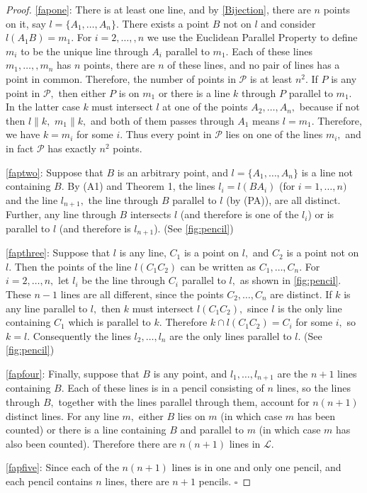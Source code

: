 \documentclass[
  twoside,
  12pt,
  letterpaper,
  fleqn]{article}
\theoremstyle{definition}
\theoremstyle{definition}
\theoremstyle{plain}
\theoremstyle{plain}
\theoremstyle{remark}
\begin{document}
\begin{proof}

\eqref{fapone}: There is at least one line, and by \eqref{Bijection},
there are \(n\) points on it, say \(l=\{A_1, \dots, A_n\}.\) There
exists a point \(B\) not on \(l\) and consider \(l(A_1B)=m_1.\) For
\(i=2, \ldots, ,n\) we use the Euclidean Parallel Property to define
\(m_i\) to be the unique line through \(A_i\) parallel to \(m_1.\) Each
of these lines \(m_1,\ldots, , m_n\) has \(n\) points, there are \(n\)
of these lines, and no pair of lines has a point in common. Therefore,
the number of points in \(\mathcal{P}\) is at least \(n^2.\) If \(P\) is
any point in \(\mathcal{P},\) then either \(P\) is on \(m_1\) or there
is a line \(k\) through \(P\) parallel to \(m_1.\) In the latter case
\(k\) must intersect \(l\) at one of the points \(A_2, \ldots, A_n,\)
because if not then \(l \parallel k,\) \(m_1 \parallel k,\) and both of
them passes through \(A_1\) means \(l=m_1.\) Therefore, we have
\(k=m_i\) for some \(i.\) Thus every point in \(\mathcal{P}\) lies on
one of the lines \(m_i,\) and in fact \(\mathcal{P}\) has exactly
\(n^2\) points.

\eqref{faptwo}: Suppose that \(B\) is an arbitrary point, and
\(l=\{A_1,\ldots, A_n\}\) is a line not containing \(B.\) By (A1) and
Theorem 1, the lines \(l_i=l(BA_i)\) (for \(i=1,\ldots,n)\) and the line
\(l_{n+1},\) the line through \(B\) parallel to \(l\) (by (PA)), are all
distinct. Further, any line through \(B\) intersects \(l\) (and
therefore is one of the \(l_i\)) or is parallel to \(l\) (and therefore
is \(l_{n+1}\)). (See \eqref{fig:pencil})

\eqref{fapthree}: Suppose that \(l\) is any line, \(C_1\) is a point on
\(l,\) and \(C_2\) is a point not on \(l.\) Then the points of the line
\(l(C_1C_2)\) can be written as \(C_1, \ldots, C_n.\) For
\(i=2, \ldots, n,\) let \(l_i\) be the line through \(C_i\) parallel to
\(l,\) as shown in \eqref{fig:pencil}. These \(n-1\) lines are all
different, since the points \(C_2, \dots, C_n\) are distinct. If \(k\)
is any line parallel to \(l,\) then \(k\) must intersect \(l(C_1C_2),\)
since \(l\) is the only line containing \(C_1\) which is parallel to
\(k.\) Therefore \(k\cap l(C_1C_2)=C_i\) for some \(i,\) so \(k=l.\)
Consequently the lines \(l_2,\ldots, l_n\) are the only lines parallel
to \(l.\) (See \eqref{fig:pencil})

\eqref{fapfour}: Finally, suppose that \(B\) is any point, and
\(l_1,\ldots, l_{n+1}\) are the \(n+1\) lines containing \(B.\) Each of
these lines is in a pencil consisting of \(n\) lines, so the lines
through \(B,\) together with the lines parallel through them, account
for \(n(n+1)\) distinct lines. For any line \(m,\) either \(B\) lies on
\(m\) (in which case \(m\) has been counted) or there is a line
containing \(B\) and parallel to \(m\) (in which case \(m\) has also
been counted). Therefore there are \(n(n+1)\) lines in \(\mathcal{L}.\)

\eqref{fapfive}: Since each of the \(n(n+1)\) lines is in one and only
one pencil, and each pencil contains \(n\) lines, there are \(n+1\)
pencils. \(\square\)

\end{proof}
\end{document}
